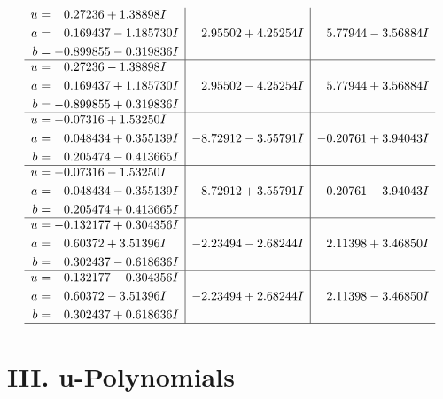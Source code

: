 \documentclass[1p]{elsarticle_modified}
\theoremstyle{definition}
\begin{document}
$$\begin{array}{c|c|c}
\begin{aligned}
u &= \phantom{-}0.27236 + 1.38898 I \\
a &= \phantom{-}0.169437 - 1.185730 I \\
b &= -0.899855 - 0.319836 I\end{aligned}
 & \phantom{-}2.95502 + 4.25254 I & \phantom{-}5.77944 - 3.56884 I \\ \hline\begin{aligned}
u &= \phantom{-}0.27236 - 1.38898 I \\
a &= \phantom{-}0.169437 + 1.185730 I \\
b &= -0.899855 + 0.319836 I\end{aligned}
 & \phantom{-}2.95502 - 4.25254 I & \phantom{-}5.77944 + 3.56884 I \\ \hline\begin{aligned}
u &= -0.07316 + 1.53250 I \\
a &= \phantom{-}0.048434 + 0.355139 I \\
b &= \phantom{-}0.205474 - 0.413665 I\end{aligned}
 & -8.72912 - 3.55791 I & -0.20761 + 3.94043 I \\ \hline\begin{aligned}
u &= -0.07316 - 1.53250 I \\
a &= \phantom{-}0.048434 - 0.355139 I \\
b &= \phantom{-}0.205474 + 0.413665 I\end{aligned}
 & -8.72912 + 3.55791 I & -0.20761 - 3.94043 I \\ \hline\begin{aligned}
u &= -0.132177 + 0.304356 I \\
a &= \phantom{-}0.60372 + 3.51396 I \\
b &= \phantom{-}0.302437 - 0.618636 I\end{aligned}
 & -2.23494 - 2.68244 I & \phantom{-}2.11398 + 3.46850 I \\ \hline\begin{aligned}
u &= -0.132177 - 0.304356 I \\
a &= \phantom{-}0.60372 - 3.51396 I \\
b &= \phantom{-}0.302437 + 0.618636 I\end{aligned}
 & -2.23494 + 2.68244 I & \phantom{-}2.11398 - 3.46850 I\\
 \hline 
 \end{array}$$\newpage
\newpage\renewcommand{\arraystretch}{1}
\centering \section*{ III. u-Polynomials}
\end{document}
